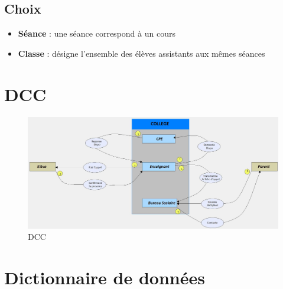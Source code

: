 \documentclass[12pt,french,titlepage]{article}
\begin{document}
	  \subsection{Choix}
	  
	  \begin{itemize}
	      \item \textbf{Séance} : une séance correspond à un cours
	      \item \textbf{Classe} : désigne l'ensemble des élèves assistants aux mêmes séances 
	  \end{itemize}
	  
	  \section{DCC}
	  
	  \begin{figure}[H]
	      \centering
	      \includegraphics[scale=0.35]{./DCC.jpg}
	      \caption{DCC}
	  \end{figure}
	  
	  \section{Dictionnaire de données}
	  
\end{document}
